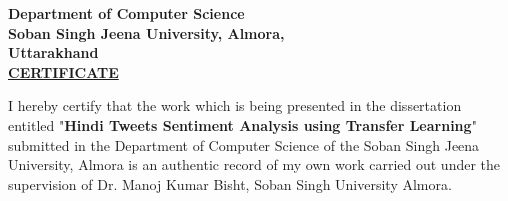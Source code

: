 \documentclass[a4paper, 12pt]{article}
\begin{document}
\begin{sloppypar}
\begin{center}
\Large{\textbf{Department of Computer Science}}\\
\Large{\textbf{Soban Singh Jeena University, Almora,}}\\
\Large{\textbf{Uttarakhand}}\\ [2cm]
\Large{\underline{\textbf{CERTIFICATE}}}\\
\end{center}
I hereby certify that the work which is being presented in the dissertation entitled "\textbf{Hindi Tweets Sentiment Analysis using Transfer Learning}" submitted in the Department of Computer Science of the Soban Singh Jeena University, Almora is an authentic record of my own work carried out under the supervision of Dr. Manoj Kumar Bisht, Soban Singh University Almora.


\end{sloppypar}
\end{document}
